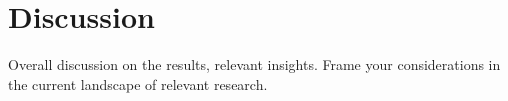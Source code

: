 \section{Discussion}
Overall discussion on the results, relevant insights.
Frame your considerations in the current landscape of relevant research.